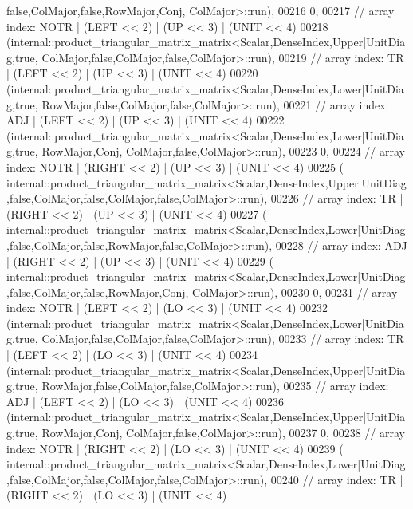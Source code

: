 \begin{DoxyCode}
       false,ColMajor,false,RowMajor,Conj, ColMajor>::run),
00216     0,
00217     \textcolor{comment}{// array index: NOTR  | (LEFT  << 2) | (UP << 3) | (UNIT  << 4)}
00218     (internal::product\_triangular\_matrix\_matrix<Scalar,DenseIndex,Upper|UnitDiag,true,
       ColMajor,false,ColMajor,false,ColMajor>::run),
00219     \textcolor{comment}{// array index: TR    | (LEFT  << 2) | (UP << 3) | (UNIT  << 4)}
00220     (internal::product\_triangular\_matrix\_matrix<Scalar,DenseIndex,Lower|UnitDiag,true,
       RowMajor,false,ColMajor,false,ColMajor>::run),
00221     \textcolor{comment}{// array index: ADJ   | (LEFT  << 2) | (UP << 3) | (UNIT  << 4)}
00222     (internal::product\_triangular\_matrix\_matrix<Scalar,DenseIndex,Lower|UnitDiag,true, RowMajor,Conj,
       ColMajor,false,ColMajor>::run),
00223     0,
00224     \textcolor{comment}{// array index: NOTR  | (RIGHT << 2) | (UP << 3) | (UNIT  << 4)}
00225     (
      internal::product\_triangular\_matrix\_matrix<Scalar,DenseIndex,Upper|UnitDiag,false,ColMajor,false,ColMajor,false,ColMajor>::run),
00226     \textcolor{comment}{// array index: TR    | (RIGHT << 2) | (UP << 3) | (UNIT  << 4)}
00227     (
      internal::product\_triangular\_matrix\_matrix<Scalar,DenseIndex,Lower|UnitDiag,false,ColMajor,false,RowMajor,false,ColMajor>::run),
00228     \textcolor{comment}{// array index: ADJ   | (RIGHT << 2) | (UP << 3) | (UNIT  << 4)}
00229     (
      internal::product\_triangular\_matrix\_matrix<Scalar,DenseIndex,Lower|UnitDiag,false,ColMajor,false,RowMajor,Conj, ColMajor>::run),
00230     0,
00231     \textcolor{comment}{// array index: NOTR  | (LEFT  << 2) | (LO << 3) | (UNIT  << 4)}
00232     (internal::product\_triangular\_matrix\_matrix<Scalar,DenseIndex,Lower|UnitDiag,true,
       ColMajor,false,ColMajor,false,ColMajor>::run),
00233     \textcolor{comment}{// array index: TR    | (LEFT  << 2) | (LO << 3) | (UNIT  << 4)}
00234     (internal::product\_triangular\_matrix\_matrix<Scalar,DenseIndex,Upper|UnitDiag,true,
       RowMajor,false,ColMajor,false,ColMajor>::run),
00235     \textcolor{comment}{// array index: ADJ   | (LEFT  << 2) | (LO << 3) | (UNIT  << 4)}
00236     (internal::product\_triangular\_matrix\_matrix<Scalar,DenseIndex,Upper|UnitDiag,true, RowMajor,Conj,
       ColMajor,false,ColMajor>::run),
00237     0,
00238     \textcolor{comment}{// array index: NOTR  | (RIGHT << 2) | (LO << 3) | (UNIT  << 4)}
00239     (
      internal::product\_triangular\_matrix\_matrix<Scalar,DenseIndex,Lower|UnitDiag,false,ColMajor,false,ColMajor,false,ColMajor>::run),
00240     \textcolor{comment}{// array index: TR    | (RIGHT << 2) | (LO << 3) | (UNIT  << 4)}

\end{DoxyCode}
